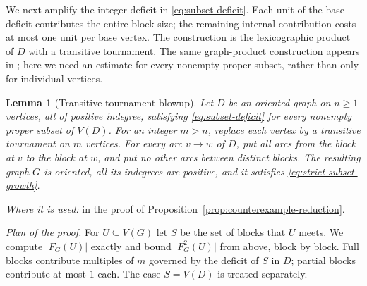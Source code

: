 \documentclass[11pt]{article}
\newtheorem{lemma}[theorem]{Lemma}
\theoremstyle{remark}
\newcommand{\abs}[1]{\lvert #1\rvert}
\begin{document}
We next amplify the integer deficit in \eqref{eq:subset-deficit}.
Each unit of the base deficit contributes the entire block size; the
remaining internal contribution costs at most one unit per base vertex.
The construction is the lexicographic product of $D$ with a transitive
tournament. The same graph-product construction appears
in \cite[Theorem~4.3]{BrantnerBrockmanKaySnively2009}; here we need an
estimate for every nonempty proper subset, rather than only for individual
vertices.

\begin{lemma}[Transitive-tournament blowup]
\label{lem:blowup}
Let $D$ be an oriented graph on $n\ge1$ vertices, all of positive
indegree, satisfying \eqref{eq:subset-deficit} for every nonempty proper
subset of $V(D)$. For an integer $m>n$, replace each vertex by a
transitive tournament on $m$ vertices. For every arc $v\to w$ of $D$,
put all arcs from the block at $v$ to the block at $w$, and put no other
arcs between distinct blocks. The resulting graph $G$ is oriented,
all its indegrees are positive, and it satisfies
\eqref{eq:strict-subset-growth}.
\end{lemma}

\emph{Where it is used:} in the proof of
Proposition~\ref{prop:counterexample-reduction}.

\emph{Plan of the proof.} For $U\subseteq V(G)$ let $S$ be the set of
blocks that $U$ meets. We compute $\abs{F_G(U)}$ exactly and bound
$\abs{F_G^2(U)}$ from above, block by block. Full blocks contribute
multiples of $m$ governed by the deficit of $S$ in $D$; partial blocks
contribute at most $1$ each. The case $S=V(D)$ is treated separately.
\end{document}
